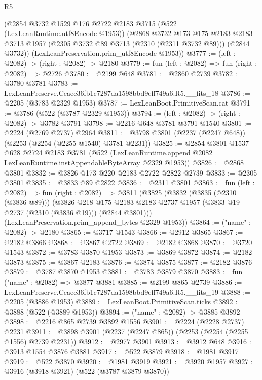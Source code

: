 \begin{lexlean}{R5}
\begin{coremodule}
    (@2854
      @3732
      @1529
      @176
      @2722
      @2183
      @3715
      (@522 (LexLeanRuntime.utf8Encode @1953))
      (@2868
        @3732
        @173
        @175
        @2183
        @2183
        @3713
        @1957
        (@2305 @3732 @89 @3713 (@2310 (@2311 @3732 @89)))
        (@2844 @3732))
      (LexLeanPreservation.prim_utf8Encode @1953))
@3777 := (left : @2082) -> (right : @2082) -> @2180
@3779 := fun (left : @2082) => fun (right : @2082) => @2726
@3780 := @2199 @648
@3781 := @2860 @2739
@3782 := @3780 @3781
@3783 := LexLeanPreserve.Ceaec36fb1c7287da1598bbd9eff749a6.R5.__fits_18
@3786 := @2205 (@3783 @2329 @1953)
@3787 := LexLeanBoot.PrimitiveScan.cat
@3791 := @3786 (@522 (@3787 @2329 @1953))
@3794 := (left : @2082) -> (right : @2082) -> @3782 @3791
@3798 := @2216 @648 @3781 @3791 @1540
@3801 := @2224 (@2769 @2737) @2964
@3811 := @3798 @3801 (@2237 (@2247 @648)) (@2253 (@2254 (@2255 @1540) @3781 @2231))
@3825 := @2854
    @3801
    @1537
    @628
    @2724
    @2183
    @3781
    (@522 (LexLeanRuntime.append @2082 LexLeanRuntime.instAppendableByteArray @2329 @1953))
@3826 := @2868 @3801
@3832 := @3826 @173 @220 @2183 @2722 @2822 @2739
@3833 := @2305 @3801
@3835 := @3833 @89 @2822
@3836 := @2311 @3801
@3863 := fun (left : @2082) =>
  fun (right : @2082) =>
  @3811
    (@3825
      (@3832
        (@3835 (@2310 (@3836 @89)))
        (@3826
          @218
          @175
          @2183
          @2183
          @2737
          @1957
          (@3833 @19 @2737 (@2310 (@3836 @19)))
          (@2844 @3801)))
      (LexLeanPreservation.prim_append_bytes @2329 @1953))
@3864 := ("name" : @2082) -> @2180
@3865 := @3717 @1543
@3866 := @2912 @3865
@3867 := @2182 @3866
@3868 := @3867 @2722
@3869 := @2182 @3868
@3870 := @3720 @1543
@3872 := @3783 @3870 @1953
@3873 := @3869 @3872
@3874 := @2182 @3873
@3875 := @3867 @2183
@3876 := @3874 @3875
@3877 := @2182 @3876
@3879 := @3787 @3870 @1953
@3881 := @3783 @3879 @3870
@3883 := fun ("name" : @2082) => @3877 @3881
@3885 := @2199 @865 @2739
@3886 := LexLeanPreserve.Ceaec36fb1c7287da1598bbd9eff749a6.R5.__fits_19
@3888 := @2205 (@3886 @1953)
@3889 := LexLeanBoot.PrimitiveScan.ticks
@3892 := @3888 (@522 (@3889 @1953))
@3894 := ("name" : @2082) -> @3885 @3892
@3898 := @2216 @865 @2739 @3892 @1556
@3901 := @2224 (@2228 @2737) @2231
@3911 := @3898 @3901 (@2237 (@2247 @865)) (@2253 (@2254 (@2255 @1556) @2739 @2231))
@3912 := @2977 @3901
@3913 := @3912 @648
@3916 := @3913 @1554 @3876 @3881
@3917 := @522 @3879
@3918 := @1981 @3917
@3919 := @522 @3870
@3920 := @1981 @3919
@3921 := @3920 @1957
@3927 := @3916 (@3918 @3921) (@522 (@3787 @3879 @3870))

\end{coremodule}
\end{lexlean}
